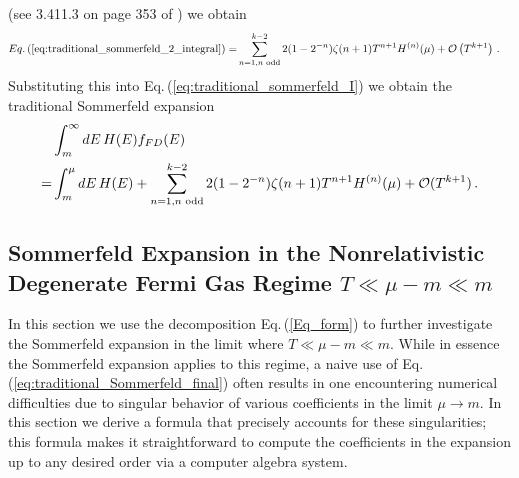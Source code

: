 \documentclass[sn-mathphys,Numbered]{sn-jnl}
\newcommand{\req}[1]{Eq.\,(\ref{#1})}
\begin{document}
(see 3.411.3 on page 353 of \cite{Gradshteyn:1943cpj}) we obtain 
\begin{align}
 \req{eq:traditional_sommerfeld_2_integral} 
 =&\sum_{n=1,n\text{ odd}}^{k-2} 2(1-2^{-n})\zeta(n+1)T^{n+1} H^{(n)}(\mu) +\mathcal{O}\left(T^{k+1}\right)\,.
\end{align}
Substituting this into \req{eq:traditional_sommerfeld_I} we obtain the traditional Sommerfeld expansion
\begin{align}
 &\int_m^\infty dE\, H(E) f_{FD}(E)\notag\\
 = &\int_m^\mu dE\, H(E)+\sum_{n=1,n\text{ odd}}^{k-2} 2(1-2^{-n})\zeta(n+1)T^{n+1} H^{(n)}(\mu) +\mathcal{O}(T^{k+1})\,.\label{eq:traditional_Sommerfeld_final}
 \end{align}
 




\subsection{Sommerfeld Expansion in the Nonrelativistic Degenerate Fermi Gas Regime $T\ll \mu-m\ll m$}\label{sec:asymp_T_0_faster}
In this section we use the decomposition \req{Eq_form} to further investigate the Sommerfeld expansion in the limit where $T\ll\mu-m\ll m$. While in essence the Sommerfeld expansion applies to this regime, a naive use of \req{eq:traditional_Sommerfeld_final} often results in one encountering numerical difficulties due to singular behavior of various coefficients in the limit $\mu\to m$. In this section we derive a formula that precisely accounts for these singularities; this formula makes it straightforward to compute the coefficients in the expansion up to any desired order via a computer algebra system.
\end{document}

